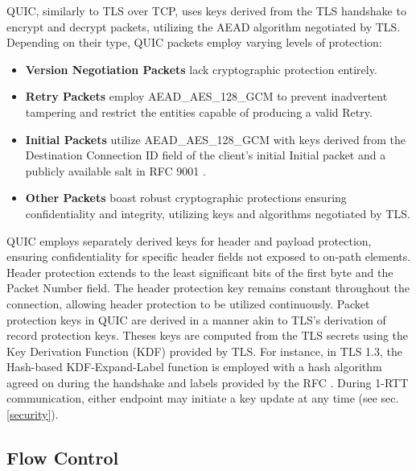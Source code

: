 QUIC, similarly to TLS over TCP, uses keys derived from the TLS handshake to encrypt and decrypt packets, utilizing the AEAD algorithm negotiated by TLS. Depending on their type, QUIC packets employ varying levels of protection:
\begin{itemize}
    \item \textbf{Version Negotiation Packets} lack cryptographic protection entirely.
    \item \textbf{Retry Packets} employ AEAD\_AES\_128\_GCM to prevent inadvertent tampering and restrict the entities capable of producing a valid Retry.
    \item \textbf{Initial Packets} utilize AEAD\_AES\_128\_GCM with keys derived from the Destination Connection ID field of the client's initial Initial packet and a publicly available salt in RFC 9001 \cite[20]{rfc9001}.
    \item \textbf{Other Packets} boast robust cryptographic protections ensuring confidentiality and integrity, utilizing keys and algorithms negotiated by TLS.
\end{itemize}

QUIC employs separately derived keys for header and payload protection, ensuring confidentiality for specific header fields not exposed to on-path elements. Header protection extends to the least significant bits of the first byte and the Packet Number field. The header protection key remains constant throughout the connection, allowing header protection to be utilized continuously. Packet protection keys in QUIC are derived in a manner akin to TLS's derivation of record protection keys. Theses keys are computed from the TLS secrets using the Key Derivation Function (KDF) provided by TLS. For instance, in TLS 1.3, the Hash-based KDF-Expand-Label function is employed with a hash algorithm agreed on during the handshake and labels provided by the RFC \cite[20]{rfc9001}. During 1-RTT communication, either endpoint may initiate a key update at any time (see sec. \ref{security}).

\subsection{Flow Control} \label{flow_control}

